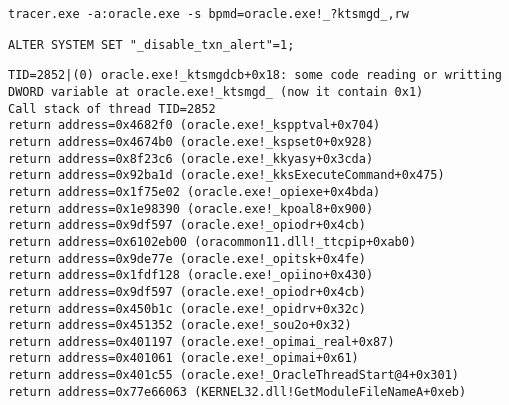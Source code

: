 
\begin{lstlisting}
tracer.exe -a:oracle.exe -s bpmd=oracle.exe!_?ktsmgd_,rw
\end{lstlisting}


\begin{lstlisting}
ALTER SYSTEM SET "_disable_txn_alert"=1;
\end{lstlisting}


\begin{lstlisting}
TID=2852|(0) oracle.exe!_ktsmgdcb+0x18: some code reading or writting DWORD variable at oracle.exe!_ktsmgd_ (now it contain 0x1)
Call stack of thread TID=2852
return address=0x4682f0 (oracle.exe!_kspptval+0x704)
return address=0x4674b0 (oracle.exe!_kspset0+0x928)
return address=0x8f23c6 (oracle.exe!_kkyasy+0x3cda)
return address=0x92ba1d (oracle.exe!_kksExecuteCommand+0x475)
return address=0x1f75e02 (oracle.exe!_opiexe+0x4bda)
return address=0x1e98390 (oracle.exe!_kpoal8+0x900)
return address=0x9df597 (oracle.exe!_opiodr+0x4cb)
return address=0x6102eb00 (oracommon11.dll!_ttcpip+0xab0)
return address=0x9de77e (oracle.exe!_opitsk+0x4fe)
return address=0x1fdf128 (oracle.exe!_opiino+0x430)
return address=0x9df597 (oracle.exe!_opiodr+0x4cb)
return address=0x450b1c (oracle.exe!_opidrv+0x32c)
return address=0x451352 (oracle.exe!_sou2o+0x32)
return address=0x401197 (oracle.exe!_opimai_real+0x87)
return address=0x401061 (oracle.exe!_opimai+0x61)
return address=0x401c55 (oracle.exe!_OracleThreadStart@4+0x301)
return address=0x77e66063 (KERNEL32.dll!GetModuleFileNameA+0xeb)
\end{lstlisting}


\subsection{}

